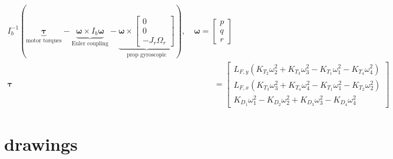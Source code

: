 \documentclass[conf]{new-aiaa}
\begin{document}
\begin{align*}
I_b^{-1}\left(
\underbrace{\boldsymbol\tau}_{\text{motor torques}}
-\underbrace{\boldsymbol\omega\times I_b\boldsymbol\omega}_{\text{Euler coupling}}
-\underbrace{\boldsymbol\omega\times\begin{bmatrix}0\\0\\-J_r\Omega_r\end{bmatrix}}_{\text{prop gyroscopic}}
\right),\quad \boldsymbol\omega=\begin{bmatrix}p\\q\\r\end{bmatrix}\\[6pt]
\boldsymbol\tau &=
\begin{bmatrix}
L_{F,y}\left(K_{T_2}\omega_2^2+K_{T_3}\omega_3^2-K_{T_1}\omega_1^2-K_{T_4}\omega_4^2\right)\\
L_{F,x}\left(K_{T_3}\omega_3^2+K_{T_4}\omega_4^2-K_{T_1}\omega_1^2-K_{T_2}\omega_2^2\right)\\
K_{D_1}\omega_1^2-K_{D_2}\omega_2^2+K_{D_3}\omega_3^2-K_{D_4}\omega_4^2
\end{bmatrix}
\end{align*}
\section{drawings}
\end{document}
